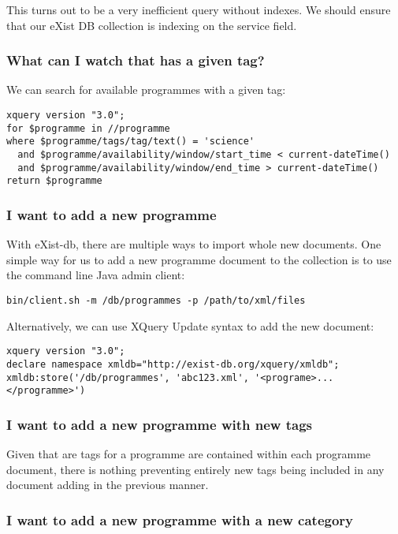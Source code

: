 \documentclass[11pt,a4paper]{article}
\begin{document}
This turns out to be a very inefficient query without indexes. We should ensure
that our eXist DB collection is indexing on the service field.

\subsubsection{What can I watch that has a given tag?}

We can search for available programmes with a given tag:

\begin{lstlisting}
xquery version "3.0";
for $programme in //programme
where $programme/tags/tag/text() = 'science'
  and $programme/availability/window/start_time < current-dateTime()
  and $programme/availability/window/end_time > current-dateTime()
return $programme
\end{lstlisting}

\subsubsection{I want to add a new programme}

With eXist-db, there are multiple ways to import whole new documents. One
simple way for us to add a new programme document to the collection
is to use the command line Java admin client:

\begin{lstlisting}
bin/client.sh -m /db/programmes -p /path/to/xml/files
\end{lstlisting}

Alternatively, we can use XQuery Update syntax to add the new document:

\begin{lstlisting}
xquery version "3.0";
declare namespace xmldb="http://exist-db.org/xquery/xmldb";
xmldb:store('/db/programmes', 'abc123.xml', '<programe>...</programme>')
\end{lstlisting}

\subsubsection{I want to add a new programme with new tags}

Given that are tags for a programme are contained within each programme
document, there is nothing preventing entirely new tags being included
in any document adding in the previous manner.

\subsubsection{I want to add a new programme with a new category}
\end{document}
